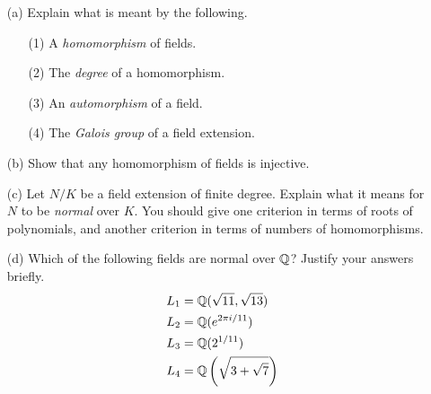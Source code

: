 \documentclass[a4paper]{article}
\begin{document}
\begin{problem}%
 \begin{itemize}
  \item[(a)] Explain what is meant by the following. 
   \begin{itemize}
    \item[(1)] A \emph{homomorphism} of fields.
    \item[(2)] The \emph{degree} of a homomorphism.
    \item[(3)] An \emph{automorphism} of a field.
    \item[(4)] The \emph{Galois group} of a field extension.
   \end{itemize}
  \item[(b)] Show that any homomorphism of fields is injective. 
  \item[(c)] Let $N/K$ be a field extension of finite degree.  Explain
   what it means for $N$ to be \emph{normal} over $K$.  You should give
   one criterion in terms of roots of polynomials, and another
   criterion in terms of numbers of homomorphisms. 
  \item[(d)] Which of the following fields are normal over ${\mathbb{Q}}$?
   Justify your answers briefly. 
   \begin{align*}
    L_1 &= {\mathbb{Q}}(\sqrt{11},\sqrt{13}) \\
    L_2 &= {\mathbb{Q}}(e^{2\pi i/11}) \\
    L_3 &= {\mathbb{Q}}(2^{1/11}) \\
    L_4 &= {\mathbb{Q}}\left(\sqrt{3+\sqrt{7}}\right)
   \end{align*}
 \end{itemize}
\end{problem}
\end{document}
